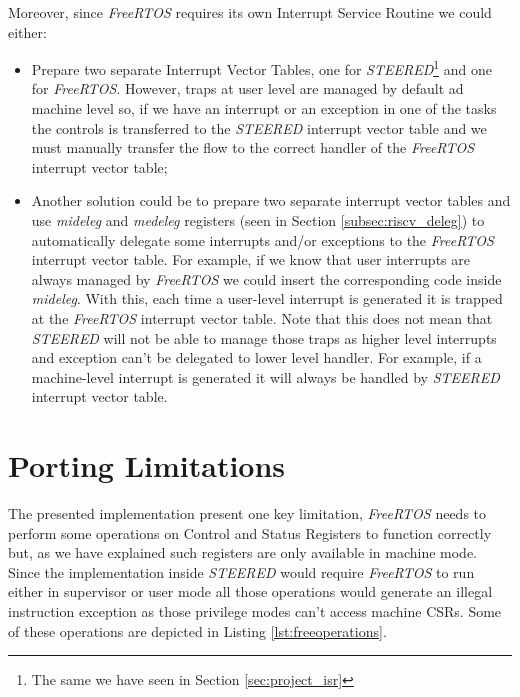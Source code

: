 Moreover, since \textit{FreeRTOS} requires its own Interrupt Service Routine we could
either:
\begin{itemize}
  \item Prepare two separate Interrupt Vector Tables, one for \textit{STEERED}\footnote{The
    same we have seen in Section \ref{sec:project_isr}} and one for \textit{FreeRTOS}.
    However, traps at user level are managed by default ad machine level so, if
    we have an interrupt or an exception in one of the tasks the controls is
    transferred to the \textit{STEERED} interrupt vector table and we must manually
    transfer the flow to the correct handler of the \textit{FreeRTOS} interrupt
    vector table;

  \item Another solution could be to prepare two separate interrupt vector tables
    and use \textit{mideleg} and \textit{medeleg} registers (seen in Section
    \ref{subsec:riscv_deleg}) to automatically delegate some interrupts and/or exceptions
    to the \textit{FreeRTOS} interrupt vector table. For example, if we know
    that user interrupts are always managed by \textit{FreeRTOS} we could insert
    the corresponding code inside \textit{mideleg}. With this, each time a user-level
    interrupt is generated it is trapped at the \textit{FreeRTOS} interrupt vector
    table. Note that this does not mean that \textit{STEERED} will not be able to
    manage those traps as higher level interrupts and exception can't be delegated
    to lower level handler. For example, if a machine-level interrupt is generated
    it will always be handled by \textit{STEERED} interrupt vector table.
\end{itemize}

\section{Porting Limitations}
\label{sec:rtos_limitations}

The presented implementation present one key limitation, \textit{FreeRTOS} needs
to perform some operations on Control and Status Registers to function correctly
but, as we have explained such registers are only available in machine mode.
Since the implementation inside \textit{STEERED} would require \textit{FreeRTOS}
to run either in supervisor or user mode all those operations would generate an
illegal instruction exception as those privilege modes can't access machine CSRs.
Some of these operations are depicted in Listing \ref{lst:freeoperations}.

